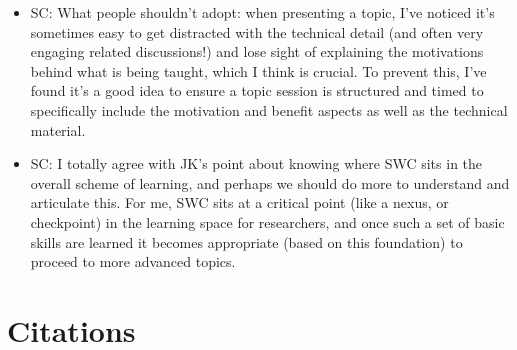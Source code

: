 \documentclass{article}
\begin{document}
\begin{itemize}
  \item SC: What people shouldn't adopt: when presenting a topic, I've
    noticed it's sometimes easy to get distracted with the technical
    detail (and often very engaging related discussions!) and lose
    sight of explaining the motivations behind what is being taught,
    which I think is crucial. To prevent this, I've found it's a good
    idea to ensure a topic session is structured and timed to
    specifically include the motivation and benefit aspects as well as
    the technical material.

  \item SC: I totally agree with JK's point about knowing where SWC
    sits in the overall scheme of learning, and perhaps we should do
    more to understand and articulate this. For me, SWC sits at a
    critical point (like a nexus, or checkpoint) in the learning space
    for researchers, and once such a set of basic skills are learned
    it becomes appropriate (based on this foundation) to proceed to
    more advanced topics.

\end{itemize}

\section{Citations}

\cite{hannay2009} \cite{prabhu2011} \cite{wilson2009}



\end{document}
